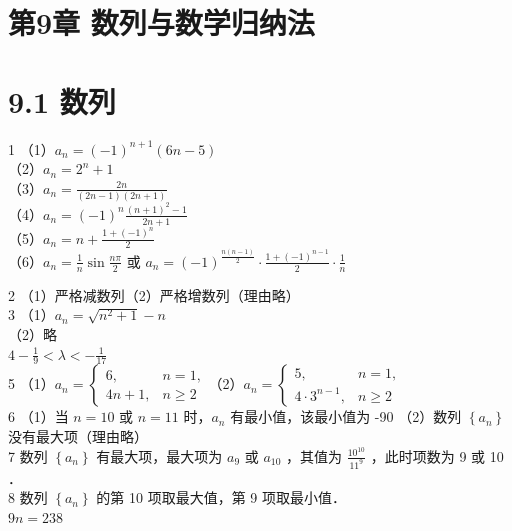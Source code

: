 \documentclass[10pt]{article}
\begin{document}
\section*{第9章 数列与数学归纳法}
\section*{9.1 数列}
1 （1）\(a_{n}=(-1)^{n+1}(6 n-5)\)\\
（2）\(a_{n}=2^{n}+1\)\\
（3）\(a_{n}=\frac{2 n}{(2 n-1)(2 n+1)}\)\\
（4）\(a_{n}=(-1)^{n} \frac{(n+1)^{2}-1}{2 n+1}\)\\
（5）\(a_{n}=n+\frac{1+(-1)^{n}}{2}\)\\
（6）\(a_{n}=\frac{1}{n} \sin \frac{n \pi}{2}\) 或 \(a_{n}=(-1)^{\frac{n(n-1)}{2}} \cdot \frac{1+(-1)^{n-1}}{2} \cdot \frac{1}{n}\)

2 （1）严格减数列（2）严格增数列（理由略）\\
3 （1）\(a_{n}=\sqrt{n^{2}+1}-n\)\\
（2）略\\
\(4-\frac{1}{9}<\lambda<-\frac{1}{17}\)\\
5 （1）\(a_{n}=\left\{\begin{array}{ll}6, & n=1, \\ 4 n+1, & n \geqslant 2\end{array}\right.\)（2）\(a_{n}= \begin{cases}5, & n=1, \\ 4 \cdot 3^{n-1}, & n \geqslant 2\end{cases}\)\\
6 （1）当 \(n=10\) 或 \(n=11\) 时，\(a_{n}\) 有最小值，该最小值为 -90 （2）数列 \(\left\{a_{n}\right\}\) 没有最大项（理由略）\\
7 数列 \(\left\{a_{n}\right\}\) 有最大项，最大项为 \(a_{9}\) 或 \(a_{10}\) ，其值为 \(\frac{10^{10}}{11^{9}}\) ，此时项数为 9 或 10 ．\\
8 数列 \(\left\{a_{n}\right\}\) 的第 10 项取最大值，第 9 项取最小值．\\
\(9 n=238\)
\end{document}
